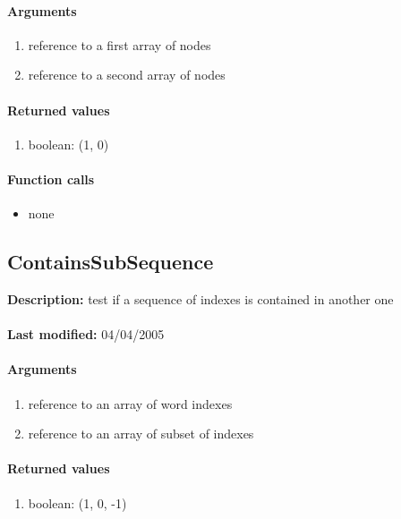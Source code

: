 \paragraph{Arguments}
\begin{enumerate}
\item reference to a first array of nodes
\item reference to a second array of nodes
\end{enumerate}

\paragraph{Returned values}
\begin{enumerate}
\item boolean: (1, 0)
\end{enumerate}

\paragraph{Function calls}
\begin{itemize}
\item none
\end{itemize}

\subsection{ContainsSubSequence}
\textbf{Description:} test if a sequence of indexes is contained in another one\\
\\\textbf{Last modified:} 04/04/2005

\paragraph{Arguments}
\begin{enumerate}
\item reference to an array of word indexes
\item reference to an array of subset of indexes
\end{enumerate}

\paragraph{Returned values}
\begin{enumerate}
\item boolean: (1, 0, -1)
\end{enumerate}

